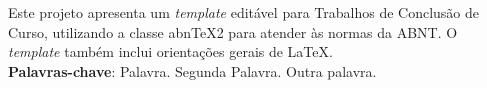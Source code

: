 
\begin{resumo}[RESUMO]
\begin{SingleSpacing}

Este projeto apresenta um \emph{template} editável para Trabalhos de Conclusão de Curso, utilizando a classe abn\TeX{}2 para atender às normas da ABNT. O \emph{template} também inclui orientações gerais de \LaTeX{}. \\

\textbf{Palavras-chave}: Palavra. Segunda Palavra. Outra palavra.

\end{SingleSpacing}
\end{resumo}
